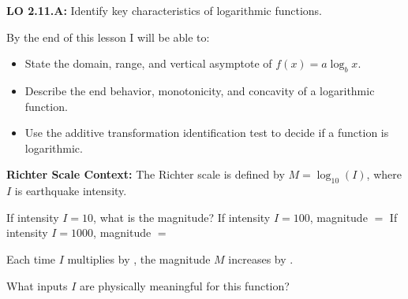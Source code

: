 \documentclass[10pt]{article}
\begin{document}
\namedateperiod

\vspace{0.08in}

\begin{objectivebox}
\textbf{LO 2.11.A:} Identify key characteristics of logarithmic functions.

By the end of this lesson I will be able to:
\begin{itemize}[leftmargin=1.5em,itemsep=3pt,topsep=3pt]
  \item State the domain, range, and vertical asymptote of $f(x) = a\log_b x$.
  \item Describe the end behavior, monotonicity, and concavity of a logarithmic function.
  \item Use the additive transformation identification test to decide if a function is logarithmic.
\end{itemize}
\end{objectivebox}

\vspace{0.06in}

\begin{vocabbox}
\end{vocabbox}

\vspace{0.06in}

\begin{hookbox}
\textbf{Richter Scale Context:} The Richter scale is defined by $M = \log_{10}(I)$, where
$I$ is earthquake intensity.

\vspace{4pt}
If intensity $I = 10$, what is the magnitude? \blank{2cm}
If intensity $I = 100$, magnitude $= $ \blank{2cm}
If intensity $I = 1000$, magnitude $= $ \blank{2cm}

\vspace{4pt}
Each time $I$ multiplies by \blank{1.5cm}, the magnitude $M$ increases by \blank{1.5cm}.

\vspace{4pt}
What inputs $I$ are physically meaningful for this function? \writeline
\end{hookbox}

\vspace{0.06in}
\end{document}
